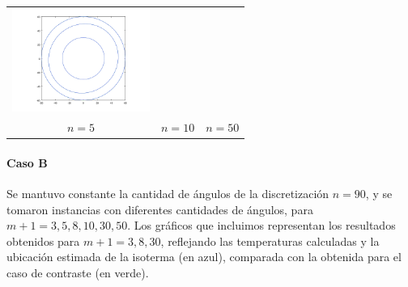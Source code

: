 {\begin{tabular}{ccc}
      \includegraphics[width=4.5cm]{graficos/2/2a-50-iso.png} \\
      {\small $n = 5$} &
      {\small $n = 10$} &
      {\small $n = 50$} \\
    \end{tabular}}

    \paragraph{Caso B} Se mantuvo constante la cantidad de ángulos de la discretización $n = 90$, y se tomaron instancias con diferentes cantidades de ángulos, para $m + 1 = 3, 5, 8, 10, 30, 50$. Los gráficos que incluimos representan los resultados obtenidos para $m + 1 = 3, 8, 30$, reflejando las temperaturas calculadas y la ubicación estimada de la isoterma (en azul), comparada con la obtenida para el caso de contraste (en verde).

